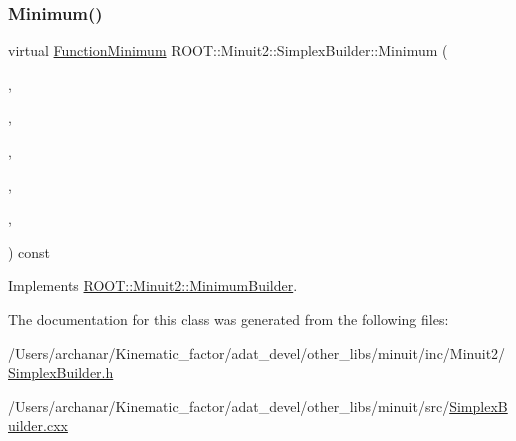 \subsubsection{\texorpdfstring{Minimum()}{Minimum()}\hspace{0.1cm}{\footnotesize\ttfamily [2/2]}}
{\footnotesize\ttfamily virtual \mbox{\hyperlink{classROOT_1_1Minuit2_1_1FunctionMinimum}{Function\+Minimum}} R\+O\+O\+T\+::\+Minuit2\+::\+Simplex\+Builder\+::\+Minimum (\begin{DoxyParamCaption}\item[{const \mbox{\hyperlink{classROOT_1_1Minuit2_1_1MnFcn}{Mn\+Fcn}} \&}]{,  }\item[{const \mbox{\hyperlink{classROOT_1_1Minuit2_1_1GradientCalculator}{Gradient\+Calculator}} \&}]{,  }\item[{const \mbox{\hyperlink{classROOT_1_1Minuit2_1_1MinimumSeed}{Minimum\+Seed}} \&}]{,  }\item[{const \mbox{\hyperlink{classROOT_1_1Minuit2_1_1MnStrategy}{Mn\+Strategy}} \&}]{,  }\item[{unsigned int}]{,  }\item[{double}]{ }\end{DoxyParamCaption}) const\hspace{0.3cm}{\ttfamily [virtual]}}



Implements \mbox{\hyperlink{classROOT_1_1Minuit2_1_1MinimumBuilder_aefaa624436afa8195af1f3393a35981f}{R\+O\+O\+T\+::\+Minuit2\+::\+Minimum\+Builder}}.



The documentation for this class was generated from the following files\+:\begin{DoxyCompactItemize}
\item 
/\+Users/archanar/\+Kinematic\+\_\+factor/adat\+\_\+devel/other\+\_\+libs/minuit/inc/\+Minuit2/\mbox{\hyperlink{other__libs_2minuit_2inc_2Minuit2_2SimplexBuilder_8h}{Simplex\+Builder.\+h}}\item 
/\+Users/archanar/\+Kinematic\+\_\+factor/adat\+\_\+devel/other\+\_\+libs/minuit/src/\mbox{\hyperlink{SimplexBuilder_8cxx}{Simplex\+Builder.\+cxx}}\end{DoxyCompactItemize}

